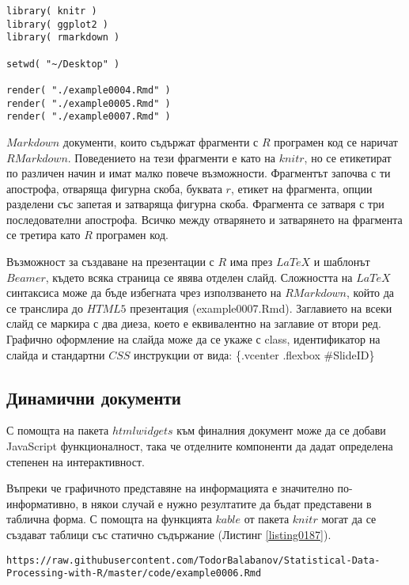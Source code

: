 \begin{lstlisting}[caption=Транслиране от RMarkdown в HTML и PDF, label=listing0185]
library( knitr )
library( ggplot2 )
library( rmarkdown )

setwd( "~/Desktop" )

render( "./example0004.Rmd" )
render( "./example0005.Rmd" )
render( "./example0007.Rmd" )
\end{lstlisting}

$Markdown$ документи, които съдържат фрагменти с $R$ програмен код се наричат $RMarkdown$. Поведението на тези фрагменти е като на $knitr$, но се етикетират по различен начин и имат малко повече възможности. Фрагментът започва с ти апострофа, отваряща фигурна скоба, буквата $r$, етикет на фрагмента, опции разделени със запетая и затваряща фигурна скоба. Фрагмента се затваря с три последователни апострофа. Всичко между отварянето и затварянето на фрагмента се третира като $R$ програмен код. 

Възможност за създаване на презентации с $R$ има през $LaTeX$ и шаблонът $Beamer$, където всяка страница се явява отделен слайд. Сложността на $LaTeX$ синтаксиса може да бъде избегната чрез използването на $RMarkdown$, който да се транслира до $HTML5$ презентация (example0007.Rmd). Заглавието на всеки слайд се маркира с два диеза, което е еквивалентно на заглавие от втори ред. Графично оформление на слайда може да се укаже с class, идентификатор на слайда и стандартни $CSS$ инструкции от вида: \{.vcenter .flexbox \#SlideID\}

\subsection{Динамични документи}

С помощта на пакета $htmlwidgets$ към финалния документ може да се добави JavaScript функционалност, така че отделните компоненти да дадат определена степенен на интерактивност. 

Въпреки че графичното представяне на информацията е значително по-информативно, в някои случай е нужно резултатите да бъдат представени в таблична форма. С помощта на функцията $kable$ от пакета $knitr$ могат да се създават таблици със статично съдържание (Листинг \ref{listing0187}).

\begin{lstlisting}[caption=Адрес на примерни интерактивни документ, label=listing0186]
https://raw.githubusercontent.com/TodorBalabanov/Statistical-Data-Processing-with-R/master/code/example0006.Rmd
\end{lstlisting}

